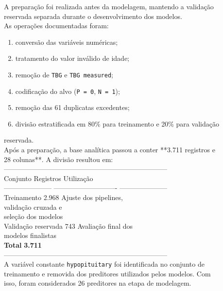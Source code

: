\documentclass{article}
\begin{document}
A preparação foi realizada antes da modelagem, mantendo a validação \\
reservada separada durante o desenvolvimento dos modelos. \\

As operações documentadas foram: \\

\begin{enumerate}
  \item  conversão das variáveis numéricas;
  \item  tratamento do valor inválido de idade;
  \item  remoção de \texttt{TBG} e \texttt{TBG measured};
  \item  codificação do alvo (\texttt{P = 0}, \texttt{N = 1});
  \item  remoção das 61 duplicatas excedentes;
  \item  divisão estratificada em 80\% para treinamento e 20\% para validação
\end{enumerate}
reservada. \\

Após a preparação, a base analítica passou a conter **3.711 registros e \\
28 colunas**. A divisão resultou em: \\

------------------------------------------------------------------------ \\
Conjunto                                 Registros Utilização \\
--------------------- ---------------------------- --------------------- \\
Treinamento                                  2.968 Ajuste dos pipelines, \\
validação cruzada e \\
seleção dos modelos \\

Validação reservada                            743 Avaliação final dos \\
modelos finalistas \\

\textbf{Total}                                \textbf{3.711} \\
------------------------------------------------------------------------ \\

A variável constante \texttt{hypopituitary} foi identificada no conjunto de \\
treinamento e removida dos preditores utilizados pelos modelos. Com \\
isso, foram considerados 26 preditores na etapa de modelagem. \\
\end{document}
